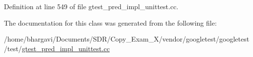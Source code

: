 Definition at line 549 of file gtest\+\_\+pred\+\_\+impl\+\_\+unittest.\+cc.



The documentation for this class was generated from the following file\+:\begin{DoxyCompactItemize}
\item 
/home/bhargavi/\+Documents/\+S\+D\+R/\+Copy\+\_\+\+Exam\+\_\+X/vendor/googletest/googletest/test/\hyperlink{gtest__pred__impl__unittest_8cc}{gtest\+\_\+pred\+\_\+impl\+\_\+unittest.\+cc}\end{DoxyCompactItemize}
